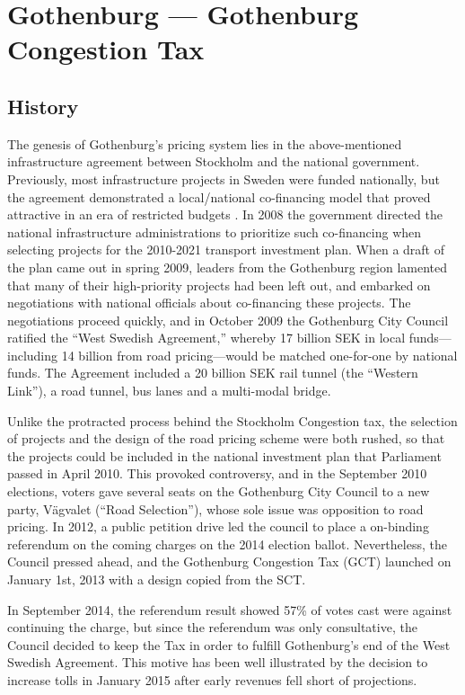 \section{Gothenburg --- Gothenburg Congestion Tax}

\subsection{History}

The genesis of Gothenburg's pricing system lies in the above-mentioned infrastructure agreement between Stockholm and the national government. Previously, most infrastructure projects in Sweden were funded nationally, but the agreement demonstrated a local/national co-financing model that proved attractive in an era of restricted budgets \citep{Borjesson2015,Hysing2015b}. In 2008 the government directed the national infrastructure administrations to prioritize such co-financing when selecting projects for the 2010-2021 transport investment plan. When a draft of the plan came out in spring 2009, leaders from the Gothenburg region lamented that many of their high-priority projects had been left out, and embarked on negotiations with national officials about co-financing these projects. The negotiations proceed quickly, and in October 2009 the Gothenburg City Council ratified the ``West Swedish Agreement,'' whereby 17 billion SEK in local funds---including 14 billion from road pricing---would be matched one-for-one by national funds. The Agreement included a 20 billion SEK rail tunnel (the ``Western Link''), a road tunnel, bus lanes and a multi-modal bridge. 

Unlike the protracted process behind the Stockholm Congestion tax, the selection of projects and the design of the road pricing scheme were both rushed, so that the projects could be included in the national investment plan that Parliament passed in April 2010. This provoked controversy, and in the September 2010 elections, voters gave several seats on the Gothenburg City Council to a new party, Vägvalet (``Road Selection''), whose sole issue was opposition to road pricing. In 2012, a public petition drive led the council to  place a on-binding referendum on the coming charges on the 2014 election ballot. Nevertheless, the Council pressed ahead, and the Gothenburg Congestion Tax (GCT) launched on January 1st, 2013 with a design copied from the SCT.

In September 2014, the referendum result showed 57\% of votes cast were against continuing the charge, but since the referendum was only consultative, the Council decided to keep the Tax in order to fulfill Gothenburg's end of the West Swedish Agreement. This motive has been well illustrated by the decision to increase tolls in January 2015 after early revenues fell short of projections.

